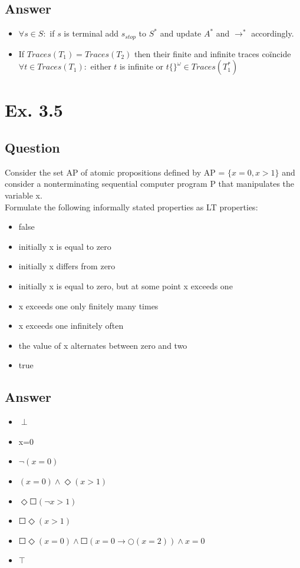 \documentclass[12pt]{article}
\begin{document}
\subsection*{Answer}
\begin{itemize}
	\item $\forall s \in S:$ if $s$ is terminal add $s_{stop}$ to $S^*$ and update $A^*$ and $\rightarrow^*$ accordingly.
	\item If $Traces(T_1) = Traces(T_2)$ then their finite and infinite traces coïncide\\
			$\forall t \in Traces(T_1):$ either $t$ is infinite or $t\{\}^\omega \in Traces(T_1^*)$
\end{itemize}


\newpage
\section*{Ex. 3.5}
\subsection*{Question}
Consider the set AP of atomic propositions defined by AP = $\{x = 0, x > 1\}$
and consider a nonterminating sequential computer program P that manipulates the variable x.\\
Formulate the following informally stated properties as LT properties:
\begin{itemize}
	\item false
	\item initially x is equal to zero
	\item initially x differs from zero
	\item initially x is equal to zero, but at some point x exceeds one
	\item x exceeds one only finitely many times
	\item x exceeds one infinitely often
	\item the value of x alternates between zero and two
	\item true
\end{itemize}

\subsection*{Answer}
\begin{itemize}
	\item $\perp$
	\item x=0
	\item $\neg(x=0)$
	\item $(x=0)\wedge\Diamond(x>1)$
	\item $\Diamond\Square(\neg x>1)$
	\item $\Square\Diamond(x>1)$
	\item $\Square\Diamond(x=0)\wedge\Square(x=0\rightarrow\Circle(x=2))\wedge x=0$
	\item $\top$
\end{itemize}
\end{document}
